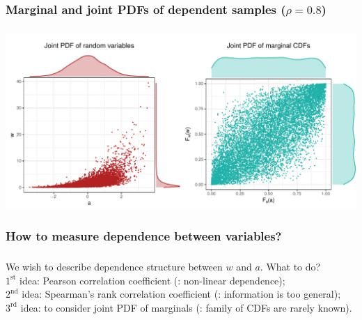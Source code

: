 \documentclass[aspectratio=169]{beamer}
\begin{document}
		\subsubsection{Marginal and joint PDFs of dependent samples ($ \rho = 0.8 $)}
			\begin{frame}
				\frametitle{\insertsubsubsection}				
				
				\begin{center}
					\includegraphics[width=0.95\linewidth]{plots/introduction/dep}
				\end{center}
				
			\end{frame}
	
		\subsubsection{How to measure dependence between variables?}
			\begin{frame}
				\frametitle{\insertsubsubsection}
				
				 We wish to describe dependence structure between $ w $ and $ a $. What to do? \\[1em]
				
				\onslide<2-> $ 1^\text{st} $ idea: Pearson correlation coefficient (: non-linear dependence); \\[1em]
				
				\onslide<3-> $ 2^\text{nd} $ idea: Spearman's rank correlation coefficient (: information is too general); \\[1em]
				
				\onslide<4-> $ 3^\text{rd} $ idea: to consider joint PDF of marginals (: family of CDFs are rarely known).
				
			\end{frame}
			
\end{document}
